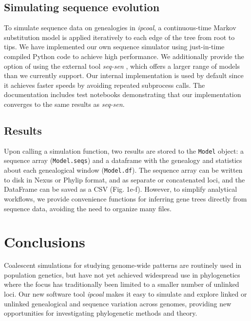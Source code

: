 \documentclass[11pt]{article}
\begin{document}
\subsection{Simulating sequence evolution}
To simulate sequence data on genealogies in \emph{ipcoal}, a continuous-time Markov substitution model is applied iteratively to each edge of the tree from root to tips. We have implemented our own sequence simulator using just-in-time compiled Python code to achieve high performance. We additionally provide the option of using the external tool \emph{seq-sen} \citep{rambaut_seqgen_1997}, which offers a larger range of models than we currently support. Our internal implementation is used by default since it achieves faster speeds by avoiding repeated subprocess calls. The documentation includes test notebooks demonstrating that our implementation converges to the same results as \emph{seq-sen}.

\subsection{Results}
Upon calling a simulation function, two results are stored to the \texttt{Model} object: a sequence array (\texttt{Model.seqs}) and a dataframe with the genealogy and statistics about each genealogical window (\texttt{Model.df}). The sequence array can be written to disk in Nexus or Phylip format, and as separate or concatenated loci, and the DataFrame can be saved as a CSV (Fig. 1e-f). However, to simplify analytical workflows, we provide convenience functions for inferring gene trees directly from sequence data, avoiding the need to organize many files.

\section{Conclusions}
\label{sec:conclusions}
Coalescent simulations for studying genome-wide patterns are routinely used in population genetics, but have not yet achieved widespread use in phylogenetics where the focus has traditionally been limited to a smaller number of unlinked loci. Our new software tool \emph{ipcoal} makes it easy to simulate and explore linked or unlinked genealogical and sequence variation across genomes, providing new opportunities for investigating phylogenetic methods and theory.
\end{document}
